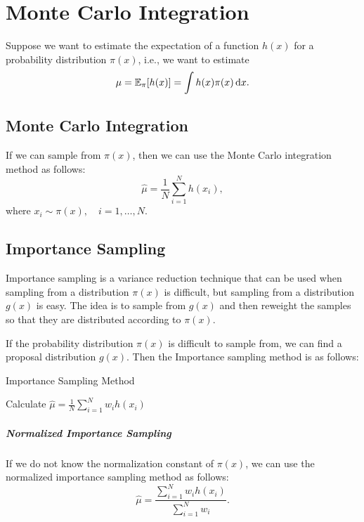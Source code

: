 \chapter{Monte Carlo Integration}

Suppose we want to estimate the expectation of a function \(h(x)\) for a probability distribution \(\pi(x)\), i.e., we want to estimate
\begin{equation}
	\mu=\mathbb{E}_{\pi}[h(x)]=\int h(x)\pi(x)\mathop{}\!\mathrm{d} x.
\end{equation}

\section{Monte Carlo Integration}

If we can sample from \(\pi(x)\), then we can use the Monte Carlo integration method as follows:
\begin{equation}
	\hat{\mu}=\frac{1}{N}\sum_{i=1}^{N}h(x_{i}),
\end{equation}
where \(x_{i}\sim\pi(x),\quad i=1,\ldots,N\).

\section{Importance Sampling}

Importance sampling is a variance reduction technique that can be used when sampling from a distribution \(\pi(x)\) is difficult, but sampling from a distribution \(g(x)\) is easy. The idea is to sample from \(g(x)\) and then reweight the samples so that they are distributed according to \(\pi(x)\).

If the probability distribution \(\pi(x)\) is difficult to sample from, we can find a proposal distribution \(g(x)\). Then the Importance sampling method is as follows:

\begin{algorithm}[H]
	\caption{Importance Sampling Method}
	Calculate \(\hat{\mu}=\frac{1}{N}\sum_{i=1}^{N}w_{i}h(x_{i})\)\;
\end{algorithm}

\paragraph{Normalized Importance Sampling}

If we do not know the normalization constant of \(\pi(x)\), we can use the normalized importance sampling method as follows:
\begin{equation}
	\hat{\mu}=\frac{\sum_{i=1}^{N}w_{i}h(x_{i})}{\sum_{i=1}^{N}w_{i}}.
\end{equation}
